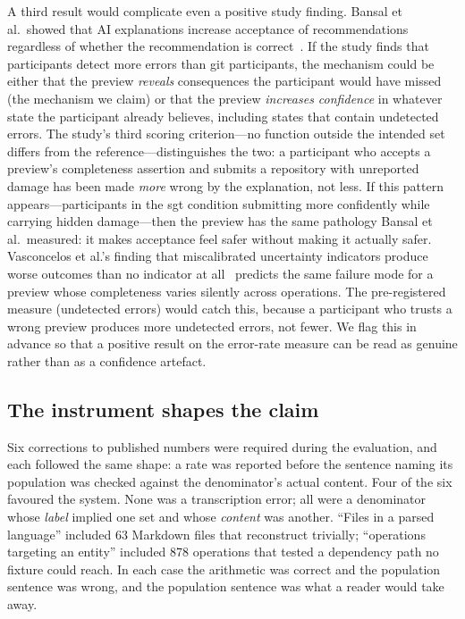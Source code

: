 A third result would complicate even a positive study finding. Bansal et al.\
showed that AI explanations increase acceptance of recommendations regardless of
whether the recommendation is correct~\cite{bansal2021}. If the study finds
that \sgt{} participants detect more errors than git participants, the mechanism
could be either that the preview \emph{reveals} consequences the participant
would have missed (the mechanism we claim) or that the preview \emph{increases
confidence} in whatever state the participant already believes, including states
that contain undetected errors. The study's third scoring criterion---no function
outside the intended set differs from the reference---distinguishes the two: a
participant who accepts a preview's completeness assertion and submits a
repository with unreported damage has been made \emph{more} wrong by the
explanation, not less. If this pattern appears---participants in the sgt condition
submitting more confidently while carrying hidden damage---then the preview has
the same pathology Bansal et al.\ measured: it makes acceptance feel safer
without making it actually safer. Vasconcelos et al.'s finding that
miscalibrated uncertainty indicators produce worse outcomes than no indicator at
all~\cite{vasconcelos2025} predicts the same failure mode for a preview whose
completeness varies silently across operations. The pre-registered measure
(undetected errors) would catch this, because a participant who trusts a
wrong preview produces more undetected errors, not fewer. We flag this in
advance so that a positive result on the error-rate measure can be read as
genuine rather than as a confidence artefact.

\subsection{The instrument shapes the claim}
\label{sec:instrument-shapes-claim}

Six corrections to published numbers were required during the evaluation, and
each followed the same shape: a rate was reported before the sentence naming its
population was checked against the denominator's actual content. Four of the six
favoured the system. None was a transcription error; all were a denominator whose
\emph{label} implied one set and whose \emph{content} was another. ``Files in a
parsed language'' included 63 Markdown files that reconstruct trivially;
``operations targeting an entity'' included 878 operations that tested a
dependency path no fixture could reach. In each case the arithmetic was correct
and the population sentence was wrong, and the population sentence was what a
reader would take away.

